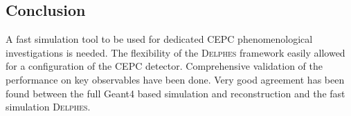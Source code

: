 \documentclass[a4paper,10pt,twoside]{cpc-hepnp}
\begin{document}
\begin{multicols}{2}
\section{Conclusion\label{sec:conclusion}}

A fast simulation tool to be used for dedicated CEPC phenomenological investigations is needed. 
The flexibility of the {\textsc{Delphes}} framework easily allowed for a configuration of the CEPC detector. 
Comprehensive validation of the performance on key observables have been done. 
Very good agreement has been found between the full Geant4 based simulation and reconstruction and the fast simulation {\textsc{Delphes}}. 

\vspace{3mm}

\begin{thebibliography}{90}

\vspace{3mm}


\end{thebibliography}
\end{multicols}
\end{document}
